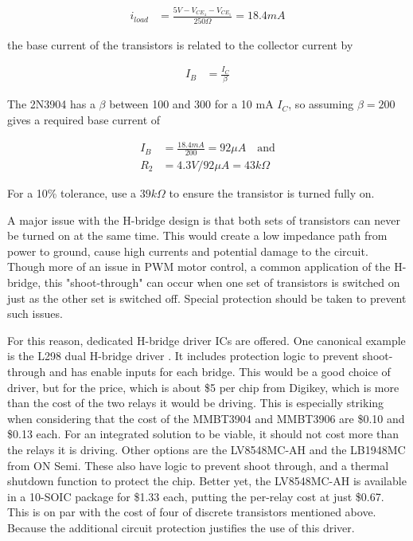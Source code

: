 \documentclass{article}
\begin{document}
		\begin{align}
			i_{load} &= \frac{5V - V_{CE_4} - V_{CE_1}}{250 \Omega} = 18.4 mA
		\end{align}

		the base current of the transistors is related to the collector current by

		\begin{align}
			I_B &= \frac{I_C}{\beta}
		\end{align}

		The 2N3904 has a $\beta$ between 100 and 300 for a 10 mA $I_C$, so assuming $\beta = 200$ gives a required base current of

		\begin{align}
			I_B &= \frac{18.4mA}{200} = 92 \mu A \quad \text{and} \\
			R_2 &= 4.3V/92\mu A = 43 k\Omega
		\end{align}

		For a 10\% tolerance, use a $39k\Omega$ to ensure the transistor is turned fully on.

		A major issue with the H-bridge design is that both sets of transistors can never be turned on at the same time.  This would create a low impedance path from power to ground, cause high currents and potential damage to the circuit.  Though more of an issue in PWM motor control, a common application of the H-bridge, this "shoot-through" can occur when one set of transistors is switched on just as the other set is switched off.  Special protection should be taken to prevent such issues.

		For this reason, dedicated H-bridge driver ICs are offered.  One canonical example is the L298 dual H-bridge driver \cite{L298datasheet}.  It includes protection logic to prevent shoot-through and has enable inputs for each bridge.  This would be a good choice of driver, but for the price, which is about \$5 per chip from Digikey, which is more than the cost of the two relays it would be driving.  This is especially striking when considering that the cost of the MMBT3904 and MMBT3906 are \$0.10 and \$0.13 each.  For an integrated solution to be viable, it should not cost more than the relays it is driving.  Other options are the LV8548MC-AH \cite{LV8548MCdatasheet} and the LB1948MC \cite{LB1948MCdatasheet} from ON Semi.  These also have logic to prevent shoot through, and a thermal shutdown function to protect the chip.  Better yet, the LV8548MC-AH is available in a 10-SOIC package for \$1.33 each, putting the per-relay cost at just \$0.67.  This is on par with the cost of four of discrete transistors mentioned above.  Because the additional circuit protection justifies the use of this driver.
\end{document}
